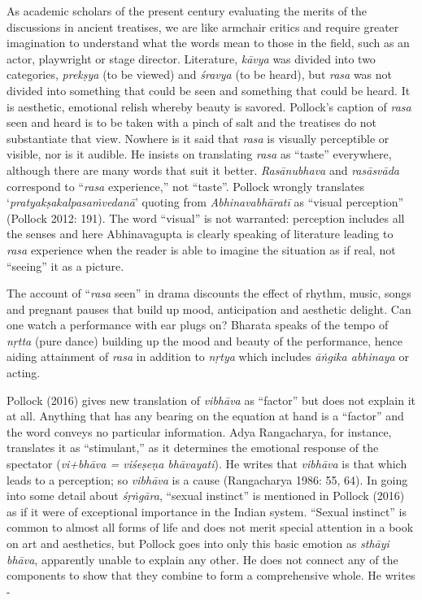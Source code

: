 As academic scholars of the present century evaluating the merits of the discussions in ancient treatises, we are like armchair critics and require greater imagination to understand what the words mean to those in the field, such as an actor, playwright or stage director. Literature, \textit{kāvya }was divided into two categories, \textit{prekṣya} (to be viewed) and \textit{śravya }(to be heard), but \textit{rasa} was not divided into something that could be seen and something that could be heard. It is aesthetic, emotional relish whereby beauty is savored. Pollock’s caption of \textit{rasa} seen and heard is to be taken with a pinch of salt and the treatises do not substantiate that view. Nowhere is it said that \textit{rasa} is visually perceptible or visible, nor is it audible. He insists on translating \textit{rasa} as “taste” everywhere, although there are many words that suit it better. \textit{Rasānubhava} and \textit{rasāsvāda} correspond to “\textit{rasa} experience,” not “taste”. Pollock wrongly translates ‘\textit{pratyakṣakalpasaṁvedanā}’ quoting from \textit{Abhinavabhāratī} as “visual perception” (Pollock 2012: 191). The word “visual” is not warranted: perception includes all the senses and here Abhinavagupta is clearly speaking of literature leading to \textit{rasa} experience when the reader is able to imagine the situation as if real, not “seeing” it as a picture.

The account of “\textit{rasa} seen” in drama discounts the effect of rhythm, music, songs and pregnant pauses that build up mood, anticipation and aesthetic delight. Can one watch a performance with ear plugs on? Bharata speaks of the tempo of \textit{nṛtta} (pure dance) building up the mood and beauty of the performance, hence aiding attainment of \textit{rasa} in addition to \textit{nṛtya} which includes \textit{āṅgika abhinaya} or acting.

Pollock (2016) gives new translation of \textit{vibhāva} as “factor” but does not explain it at all. Anything that has any bearing on the equation at hand is a “factor” and the word conveys no particular information. Adya Rangacharya, for instance, translates it as “stimulant,” as it determines the emotional response of the spectator (\textit{vi+bhāva = viśeṣeṇa bhāvayati}). He writes that \textit{vibhāva} is that which leads to a perception; so \textit{vibhāva} is a cause (Rangacharya 1986: 55, 64). In going into some detail about \textit{śṛṅgāra}, “sexual instinct” is mentioned in Pollock (2016) as if it were of exceptional importance in the Indian system. “Sexual instinct” is common to almost all forms of life and does not merit special attention in a book on art and aesthetics, but Pollock goes into only this basic emotion as \textit{sthāyi bhāva}, apparently unable to explain any other. He does not connect any of the components to show that they combine to form a comprehensive whole. He writes -

